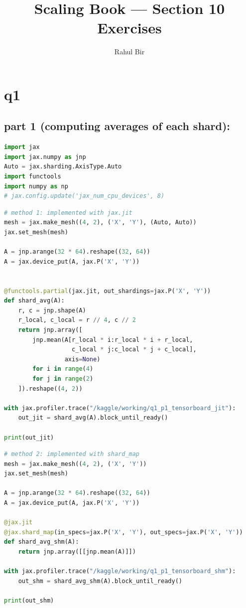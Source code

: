\documentclass[11pt]{article}
\title{Scaling Book --- Section 10 Exercises}
\author{Rahul Bir}
\date{}
\begin{document}
\maketitle

\section*{q1}

\subsection*{part 1 (computing averages of each shard):}

\begin{lstlisting}[language=Python]
import jax
import jax.numpy as jnp
Auto = jax.sharding.AxisType.Auto
import functools
import numpy as np
# jax.config.update('jax_num_cpu_devices', 8)
\end{lstlisting}

\begin{lstlisting}[language=Python]
# method 1: implemented with jax.jit
mesh = jax.make_mesh((4, 2), ('X', 'Y'), (Auto, Auto))
jax.set_mesh(mesh)

A = jnp.arange(32 * 64).reshape((32, 64))
A = jax.device_put(A, jax.P('X', 'Y'))


@functools.partial(jax.jit, out_shardings=jax.P('X', 'Y'))
def shard_avg(A):
    r, c = jnp.shape(A)
    r_local, c_local = r // 4, c // 2
    return jnp.array([
        jnp.mean(A[r_local * i:r_local * i + r_local,
                   c_local * j:c_local * j + c_local],
                 axis=None)
        for i in range(4)
        for j in range(2)
    ]).reshape((4, 2))

with jax.profiler.trace("/kaggle/working/q1_p1_tensorboard_jit"):
    out_jit = shard_avg(A).block_until_ready()

print(out_jit)
\end{lstlisting}

\begin{lstlisting}[language=Python]
# method 2: implemented with shard_map
mesh = jax.make_mesh((4, 2), ('X', 'Y'))
jax.set_mesh(mesh)

A = jnp.arange(32 * 64).reshape((32, 64))
A = jax.device_put(A, jax.P('X', 'Y'))

@jax.jit
@jax.shard_map(in_specs=jax.P('X', 'Y'), out_specs=jax.P('X', 'Y'))
def shard_avg_shm(A):
    return jnp.array([[jnp.mean(A)]])

with jax.profiler.trace("/kaggle/working/q1_p1_tensorboard_shm"):
    out_shm = shard_avg_shm(A).block_until_ready()

print(out_shm)
\end{lstlisting}
\end{document}
